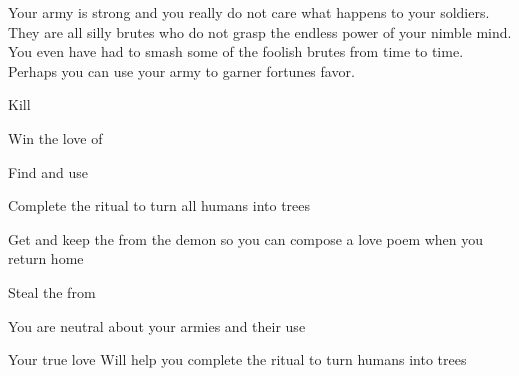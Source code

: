 \documentclass[char]{guildcamp2}
\begin{document}
Your army is strong and you really do not care what happens to your soldiers. They are all silly brutes who do not grasp the endless power of your nimble mind. You even have had to smash some of the foolish brutes from time to time. Perhaps you can use your army to garner fortunes favor.  

\begin{itemz}[Goals]
  \item Kill \cWizard{}
  \item Win the love of \cTreeFae{}
  \item Find and use \iLovePotion{}
	\item Complete the ritual to turn all humans into trees
	\item Get and keep the \iQuill{} from the demon so you can compose a love poem when you return home
	\item Steal the \iTearofMagic{} from \cBabyFae{}
\end{itemz}

\begin{itemz}[Notes]
  \item You are neutral about your armies and their use
\end{itemz}


\begin{contacts}
  \contact{\cTreeFae{}} Your true love
  \contact{\cEnt{}} Will help you complete the ritual to turn humans into trees
\end{contacts}
\end{document}
